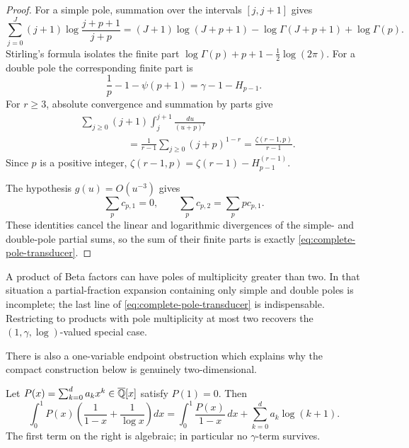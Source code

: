 \begin{proof}
For a simple pole, summation over the intervals \([j,j+1]\) gives
\[
 \sum_{j=0}^J(j+1)
 \log\frac{j+p+1}{j+p}
 =(J+1)\log(J+p+1)-\log\Gamma(J+p+1)+\log\Gamma(p).
\]
Stirling's formula isolates the finite part
\(\log\Gamma(p)+p+1-\frac12\log(2\pi)\).
For a double pole the corresponding finite part is
\[
 \frac1p-1-\psi(p+1)=\gamma-1-H_{p-1}.
\]
For \(r\ge3\), absolute convergence and summation by parts give
\begin{align*}
 &\sum_{j\ge0}(j+1)\int_j^{j+1}\frac{du}{(u+p)^r}\\
 &\hspace{2cm}=\frac1{r-1}\sum_{j\ge0}(j+p)^{1-r}
 =\frac{\zeta(r-1,p)}{r-1}.
\end{align*}
Since \(p\) is a positive integer,
\(\zeta(r-1,p)=\zeta(r-1)-H_{p-1}^{(r-1)}\).

The hypothesis \(g(u)=O(u^{-3})\) gives
\[
 \sum_pc_{p,1}=0,
 \qquad
 \sum_pc_{p,2}=\sum_ppc_{p,1}.
\]
These identities cancel the linear and logarithmic divergences of the
simple- and double-pole partial sums, so the sum of their finite parts is
exactly \eqref{eq:complete-pole-transducer}.
\end{proof}

\begin{remark}
A product of Beta factors can have poles of multiplicity greater than two.
In that situation a partial-fraction expansion containing only simple and
double poles is incomplete; the last line of
\eqref{eq:complete-pole-transducer} is indispensable.  Restricting to
products with pole multiplicity at most two recovers the
\((1,\gamma,\log)\)-valued special case.
\end{remark}

There is also a one-variable endpoint obstruction which explains why the
compact construction below is genuinely two-dimensional.

\begin{lemma}
\label{lem:one-variable-endpoint-no-go}
Let \(P(x)=\sum_{k=0}^d a_kx^k\in\overline{\mathbb Q}[x]\) satisfy \(P(1)=0\).  Then
\begin{equation}\label{eq:endpoint-no-go-exact}
 \int_0^1P(x)\left(\frac1{1-x}+\frac1{\log x}\right)dx
 =\int_0^1\frac{P(x)}{1-x}\,dx
  +\sum_{k=0}^da_k\log(k+1).
\end{equation}
The first term on the right is algebraic; in particular no \(\gamma\)-term
survives.
\end{lemma}

